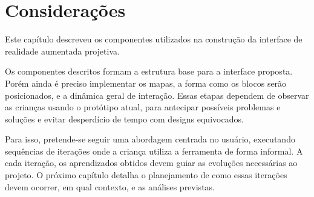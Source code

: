 \section{Considerações}
Este capítulo descreveu os componentes utilizados na construção da interface de realidade aumentada projetiva. 

Os componentes descritos formam a estrutura base para a interface proposta. Porém ainda é preciso implementar os mapas, a forma como os blocos serão posicionados, e a dinâmica geral de interação. Essas etapas dependem de observar as crianças usando o protótipo atual, para antecipar possíveis problemas e soluções e evitar desperdício de tempo com designs equivocados.

Para isso, pretende-se seguir uma abordagem centrada no usuário, executando sequências de iterações onde a criança utiliza a ferramenta de forma informal. A cada iteração, os aprendizados obtidos devem guiar as evoluções necessárias ao projeto. O próximo capítulo detalha o planejamento de como essas iterações devem ocorrer, em qual contexto, e as análises previstas.
